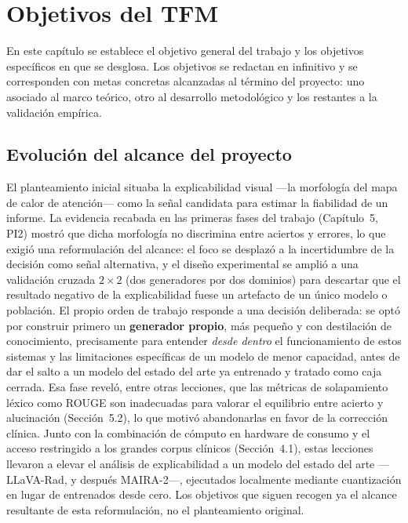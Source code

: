 \chapter{Objetivos del TFM}

En este capítulo se establece el objetivo general del trabajo y los objetivos específicos en que
se desglosa. Los objetivos se redactan en infinitivo y se corresponden con metas concretas
alcanzadas al término del proyecto: uno asociado al marco teórico, otro al desarrollo
metodológico y los restantes a la validación empírica.

\section{Evolución del alcance del proyecto}
El planteamiento inicial situaba la explicabilidad visual —la morfología del mapa de calor de
atención— como la señal candidata para estimar la fiabilidad de un informe. La evidencia recabada
en las primeras fases del trabajo (Capítulo~5, PI2) mostró que dicha morfología no discrimina entre
aciertos y errores, lo que exigió una reformulación del alcance: el foco se desplazó a la
incertidumbre de la decisión como señal alternativa, y el diseño experimental se amplió a una
validación cruzada \(2\times2\) (dos generadores por dos dominios) para descartar que el resultado
negativo de la explicabilidad fuese un artefacto de un único modelo o población. El propio orden de trabajo responde a una decisión deliberada: se optó por construir primero un
\textbf{generador propio}, más pequeño y con destilación de conocimiento, precisamente para entender
\emph{desde dentro} el funcionamiento de estos sistemas y las limitaciones específicas de un modelo
de menor capacidad, antes de dar el salto a un modelo del estado del arte ya entrenado y tratado como
caja cerrada. Esa fase reveló, entre otras lecciones, que las métricas de solapamiento léxico como
ROUGE son inadecuadas para valorar el equilibrio entre acierto y alucinación (Sección~5.2), lo que
motivó abandonarlas en favor de la corrección clínica. Junto con la combinación de cómputo en
hardware de consumo y el acceso restringido a los grandes corpus clínicos (Sección~4.1), estas
lecciones llevaron a elevar el análisis de explicabilidad a un modelo del estado del arte —LLaVA-Rad,
y después MAIRA-2—, ejecutados localmente mediante cuantización en lugar de entrenados desde cero.
Los objetivos que siguen recogen ya el alcance resultante de esta reformulación, no el planteamiento
original.

